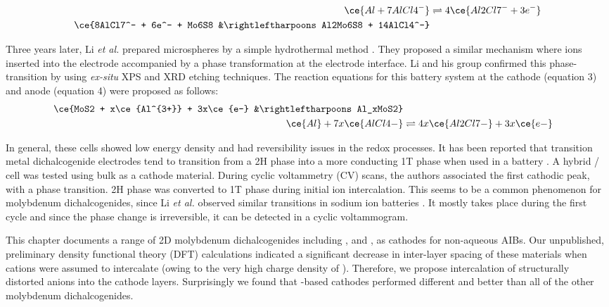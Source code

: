 \begin{align}
          \ce{Al + 7AlCl4^-} &\rightleftharpoons 4\ce{Al2Cl7^- + 3e^-}\\
\ce{8AlCl7^- + 6e^- + Mo6S8 &\rightleftharpoons Al2Mo6S8 + 14AlCl4^-}
\end{align}

Three years later, Li \textit{et al.} prepared  microspheres by a simple hydrothermal method \cite{li_rechargeable_2018}. They proposed a similar mechanism where  ions inserted into the electrode accompanied by a phase transformation at the electrode interface. Li and his group confirmed this phase-transition by using \textit{ex-situ} XPS and XRD etching techniques. The reaction equations for this battery system at the cathode (equation 3) and anode (equation 4) were proposed as follows:
\begin{align}
    \ce{MoS2 + x\ce{Al^{3+}}  + 3x\ce{e-} &\rightleftharpoons Al_xMoS2}\\
    \ce{Al} + 7x\ce{AlCl4-} &\rightleftharpoons 4x\ce{Al2Cl7-} + 3x\ce{e-}
\end{align}

In general, these cells showed low energy density and had reversibility issues in the redox processes. It has been reported that transition metal dichalcogenide electrodes tend to transition from a 2H phase into a more conducting 1T phase when used in a battery \cite{fan_hybrid_2017}. A hybrid / cell was tested using bulk  as a cathode material. During cyclic voltammetry (CV) scans, the authors associated the first cathodic peak, with a phase transition. 2H phase  was converted to 1T phase during initial ion intercalation. This seems to be a common phenomenon for molybdenum dichalcogenides, since Li \textit{et al.} observed similar transitions in sodium ion batteries \cite{li_enhancing_2015}. It mostly takes place during the first cycle and since the phase change is irreversible, it can be detected in a cyclic voltammogram.

This chapter documents a range of 2D molybdenum dichalcogenides including ,  and , as cathodes for non-aqueous AIBs. Our unpublished, preliminary density functional theory (DFT) calculations indicated a significant decrease in inter-layer spacing of these materials when  cations were assumed to intercalate (owing to the very high charge density of ). Therefore, we propose intercalation of structurally distorted  anions into the cathode layers. Surprisingly we found that -based cathodes performed different and better than all of the other molybdenum dichalcogenides.

